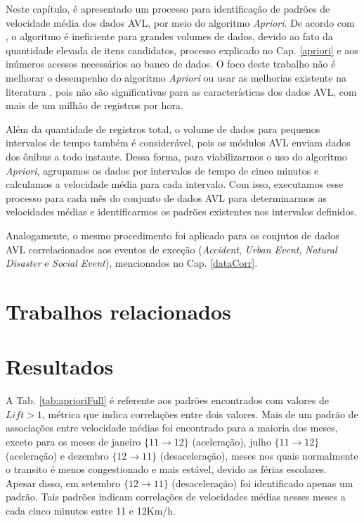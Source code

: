 \documentclass[
	12pt,				%
	oneside,			%
	a4paper,			%
	english,			%
	brazil				%
	]{abntex2ppgsi}
\begin{document}
Neste capítulo, é apresentado um processo para identificação de padrões de velocidade média dos dados AVL, por meio do algoritmo \textit{Apriori}. De acordo com \cite{xie2008optimization}, o algoritmo é ineficiente para grandes volumes de dados, devido ao fato da quantidade elevada de itens candidatos, processo explicado no Cap. \ref{apriori} e aos inúmeros acessos necessários ao banco de dados. O foco deste trabalho não é melhorar o desempenho do algoritmo \textit{Apriori} ou usar as melhorias existente na literatura \cite{xie2008optimization, zhang2014method}, pois não são significativas para as características dos dados AVL, com mais de um milhão de registros por hora.

Além da quantidade de registros total, o volume de dados para pequenos intervalos de tempo também é considerável, pois os módulos AVL enviam dados dos ônibus a todo instante. Dessa forma, para viabilizarmos o uso do algoritmo \textit{Apriori}, agrupamos os dados por intervalos de tempo de cinco minutos e calculamos a velocidade média para cada intervalo. Com isso, executamos esse processo para cada mês do conjunto de dados AVL para determinarmos as velocidades médias e identificarmos os padrões existentes nos intervalos definidos.

Analogamente, o mesmo procedimento foi aplicado para os conjutos de dados AVL correlacionados aos eventos de exceção (\textit{Accident}, \textit{Urban Event}, \textit{Natural Disaster} e \textit{Social Event}), mencionados no Cap. \ref{dataCorr}.

\section{Trabalhos relacionados}

\section{Resultados}

A Tab. \ref{tab:aprioriFull} é referente aos padrões encontrados com valores de $\textit{Lift} > 1$, métrica que indica correlações entre dois valores. Mais de um padrão de associações entre velocidade médias foi encontrado para a maioria dos meses, exceto para os meses de janeiro $\lbrace 11 \rightarrow 12 \rbrace$ (aceleração), julho $\lbrace 11 \rightarrow 12\rbrace$ (aceleração) e dezembro $\lbrace12 \rightarrow 11\rbrace$ (desaceleração), meses nos quais normalmente o transito é menos congestionado e mais estável, devido as férias escolares. Apesar disso, em setembro $\lbrace12 \rightarrow 11\rbrace$ (desaceleração) foi identificado apenas um padrão. Tais padrões indicam correlações de velocidades médias nesses meses a cada cinco minutos entre 11 e 12Km/h.
\end{document}
